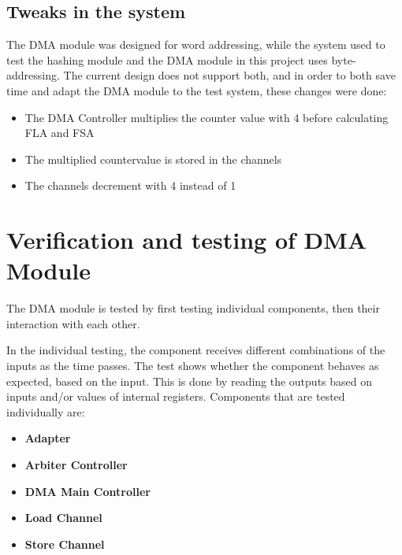 \begin{appendix}
\subsection{Tweaks in the system}The DMA module was designed for word addressing, while the system used to test the hashing module and the DMA module in this project uses byte-addressing.
The current design does not support both, and in order to both save time and adapt the DMA module to the test system, these changes were done:
\begin{itemize}
    \item The DMA Controller multiplies the counter value with 4 before calculating FLA and FSA
    \item The multiplied countervalue is stored in the channels
    \item The channels decrement with 4 instead of 1 
\end{itemize}

\section{Verification and testing of DMA Module}

The DMA module is tested by first testing individual components, then their interaction with each other.

In the individual testing, the component receives different combinations of the inputs as the time passes.
The test shows whether the component behaves as expected, based on the input.
This is done by reading the outputs based on inputs and/or values of internal registers.
Components that are tested individually are:
\begin{itemize}
    \item \textbf{Adapter} 
    \item \textbf{Arbiter Controller}
    \item \textbf{DMA Main Controller}
    \item \textbf{Load Channel}
    \item \textbf{Store Channel}
\end{itemize}


\end{appendix}
